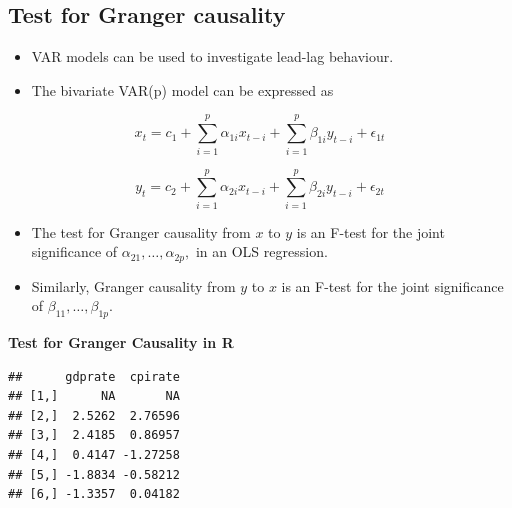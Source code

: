 \documentclass[]{book}
\newenvironment{Shaded}{\begin{snugshade}}{\end{snugshade}}
\newcommand{\DataTypeTok}[1]{\textcolor[rgb]{0.13,0.29,0.53}{#1}}
\newcommand{\DecValTok}[1]{\textcolor[rgb]{0.00,0.00,0.81}{#1}}
\newcommand{\KeywordTok}[1]{\textcolor[rgb]{0.13,0.29,0.53}{\textbf{#1}}}
\newcommand{\NormalTok}[1]{#1}
\newcommand{\OperatorTok}[1]{\textcolor[rgb]{0.81,0.36,0.00}{\textbf{#1}}}
\newcommand{\StringTok}[1]{\textcolor[rgb]{0.31,0.60,0.02}{#1}}
\providecommand{\tightlist}{%
  \setlength{\itemsep}{0pt}\setlength{\parskip}{0pt}}
\begin{document}
\hypertarget{test-for-granger-causality}{%
\subsection{Test for Granger causality}\label{test-for-granger-causality}}

\begin{itemize}
\tightlist
\item
  VAR models can be used to investigate lead-lag behaviour.
\item
  The bivariate VAR(p) model can be expressed as
\end{itemize}

\[x_t = c_1+\sum_{i=1}^p\alpha_{1i}x_{t-i}+ \sum_{i=1}^p\beta_{1i}y_{t-i}+\epsilon_{1t}\]

\[y_t = c_2+\sum_{i=1}^p\alpha_{2i}x_{t-i}+ \sum_{i=1}^p\beta_{2i}y_{t-i}+\epsilon_{2t}\]

\begin{itemize}
\item
  The test for Granger causality from \(x\) to \(y\) is an F-test for the joint significance of \(\alpha_{21},\dots, \alpha_{2p},\) in an OLS regression.
\item
  Similarly, Granger causality from \(y\) to \(x\) is an F-test for the joint significance of \(\beta_{11},\dots, \beta_{1p}\).
\end{itemize}

\newpage

\textbf{Test for Granger Causality in R}

\begin{Shaded}
\end{Shaded}

\begin{verbatim}
##      gdprate  cpirate
## [1,]      NA       NA
## [2,]  2.5262  2.76596
## [3,]  2.4185  0.86957
## [4,]  0.4147 -1.27258
## [5,] -1.8834 -0.58212
## [6,] -1.3357  0.04182
\end{verbatim}
\end{document}
